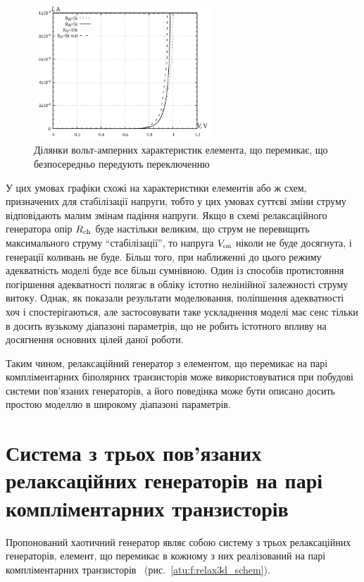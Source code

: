 \begin{figure}[htb!]
  \centerline{\includegraphics[width=0.6\textwidth]{p/relax3d_sw_va_mini.png} }
\caption{Ділянки вольт-амперних характеристик елемента, що перемикає, що безпосередньо передують переключенню}
\label{atu:f:relax3d_sw_vah_mini}
\end{figure}

У цих умовах графіки схожі на характеристики елементів або
ж схем, призначених для стабілізації напруги, тобто у цих
умовах суттєві зміни струму відповідають малим змінам падіння
напруги. Якщо в схемі релаксаційного генератора опір
$ R _\mathrm{ch} $ буде настільки великим, що струм не перевищить
максимального струму ``стабілізації'', то напруга
$ V _\mathrm{on} $ ніколи не буде досягнута, і генерації коливань не
буде. Більш того, при наближенні до цього режиму адекватність
моделі буде все більш сумнівною. Один із способів протистояння
погіршення адекватності полягає в обліку істотно нелінійної
залежності струму витоку. Однак, як показали результати
моделювання, поліпшення адекватності хоч і спостерігаються,
але застосовувати таке ускладнення моделі має сенс тільки в
досить вузькому діапазоні параметрів, що не робить істотного
впливу на досягнення основних цілей даної роботи.

Таким чином, релаксаційний генератор з  елементом, що перемикає
на парі компліментарних біполярних транзисторів може
використовуватися при побудові системи пов'язаних генераторів,
а його поведінка може бути описано досить простою моделлю в
широкому діапазоні параметрів.



\section{Система з трьох пов'язаних релаксаційних генераторів на парі компліментарних транзисторів}
\label{atu:sec:relax3d}


Пропонований хаотичний генератор являє собою систему з трьох
релаксаційних генераторів, елемент, що перемикає в кожному з
них реалізований на парі компліментарних транзисторів~\cite{atu_st107}
(рис.~\ref{atu:f:relax3d_schem}).

